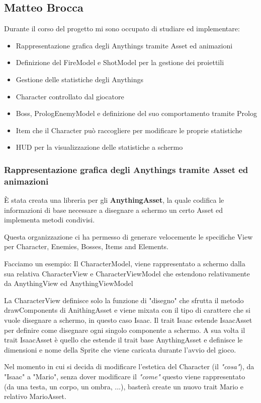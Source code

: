 \subsection{Matteo Brocca}
Durante il corso del progetto mi sono occupato di studiare ed implementare:
\begin{itemize}
	\item Rappresentazione grafica degli Anythings tramite Asset ed animazioni
    \item Definizione del FireModel e ShotModel per la gestione dei proiettili
    \item Gestione delle statistiche degli Anythings
    \item Character controllato dal giocatore
    \item Boss, PrologEnemyModel e definizione del suo comportamento tramite Prolog
    \item Item che il Character può raccogliere per modificare le proprie statistiche
    \item HUD per la visualizzazione delle statistiche a schermo
\end{itemize}

\subsubsection{Rappresentazione grafica degli Anythings tramite Asset ed animazioni}
È stata creata una libreria per gli \textbf{AnythingAsset}, 
la quale codifica le informazioni di base necessare a disegnare a schermo un certo Asset ed implementa metodi condivisi. 

Questa organizzazione ci ha permesso di generare velocemente le specifiche View per Character, Enemies, Bosses, Items and Elements.

Facciamo un esempio:
Il CharacterModel, viene rappresentato a schermo dalla sua relativa CharacterView e CharacterViewModel 
che estendono relativamente da AnythingView ed AnythingViewModel

La CharacterView definisce solo la funzione di "disegno" che sfrutta il metodo drawComponents di AnithingAsset 
e viene mixata con il tipo di carattere che si vuole disegnare a schermo, in questo caso Isaac.
Il trait Isaac estende IsaacAsset per definire come disegnare ogni singolo componente a schermo.
A sua volta il trait IsaacAsset è quello che estende il trait base AnythingAsset 
e definisce le dimensioni e nome della Sprite che viene caricata durante l'avvio del gioco.

Nel momento in cui si decida di modificare l'estetica del Character (il \textit{"cosa"}), da "Isaac" a "Mario",
senza dover modificare il \textit{"come"} questo viene rappresentato (da una testa, un corpo, un ombra, ...),
basterà create un nuovo trait Mario e relativo MarioAsset.

